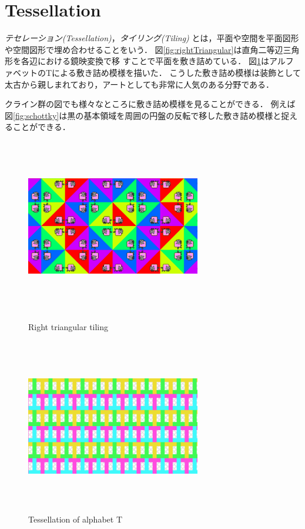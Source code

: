 
\section{Tessellation}

\emph{テセレーション}{\it (Tessellation)}，\emph{タイリング}{\it(Tiling)}
とは，平面や空間を平面図形や空間図形で埋め合わせることをいう．
図\ref{fig:rightTriangular}は直角二等辺三角形を各辺における鏡映変換で移
すことで平面を敷き詰めている．
図\ref{fig:tessellationT}はアルファベットのTによる敷き詰め模様を描いた．
こうした敷き詰め模様は装飾として太古から親しまれており，アートとしても非常に人気のある分野である．

クライン群の図でも様々なところに敷き詰め模様を見ることができる．
例えば図\ref{fig:schottky}は黒の基本領域を周囲の円盤の反転で移した敷き詰め模様と捉えることができる．

\begin{figure}[h!tbp]
 \begin{minipage}{0.49\hsize}
  \center
  \includegraphics[width=3in, height=3in, keepaspectratio]{../img/tessellation/rightTriangular.pdf}
  \caption{Right triangular tiling}
  \label{fig:rightTriangular}
 \end{minipage}
 \begin{minipage}{0.49\hsize}
  \center
  \includegraphics[width=3in, height=3in, keepaspectratio]{../img/tessellation/tessellationT.pdf}
  \caption{Tessellation of alphabet T}
  \label{fig:tessellationT}
 \end{minipage}
\end{figure}

